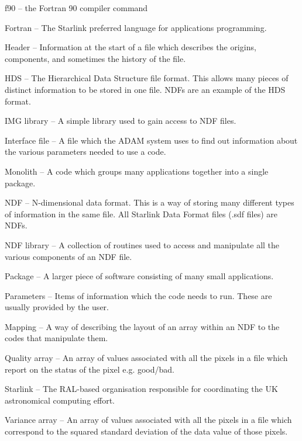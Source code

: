 {\sf f90} -- the Fortran 90 compiler command

{\sf Fortran} -- The Starlink preferred language for applications programming.

{\sf Header} --
Information at the start of a file which describes the origins, components,
and sometimes the history of the file.

{\sf HDS} --
The Hierarchical Data Structure file format. This allows many pieces of
distinct information to be stored in one file. NDFs are an example of
the HDS format.

{\sf IMG library} --
A simple library used to gain access to NDF files.

{\sf Interface file} -- A file which the ADAM system uses to find out
information about the various parameters needed to use a code.

{\sf Monolith} --
A code which groups many applications together into a single package.

{\sf NDF} -- N-dimensional data format. This is a way of storing many
different types of information in the same file. All Starlink Data Format
files (.sdf files) are NDFs.

{\sf NDF library} --
A collection of routines used to access and manipulate all the various
components of an NDF file.

{\sf Package} -- A larger piece of software consisting of many small
applications.

{\sf Parameters} -- Items of information which the code needs to run. These
are usually provided by the user.

{\sf Mapping} -- A way of describing the layout of an array within an NDF
to the codes that manipulate them.

{\sf Quality array} -- An array of values associated with all the pixels in
a file which report on the status of the pixel e.g. good/bad.

{\sf Starlink} -- The RAL-based organisation responsible for
coordinating the UK astronomical computing effort.

{\sf Variance array} -- An array of values associated with all the pixels in
a file which correspond to the squared standard deviation of the data
value of those pixels.


